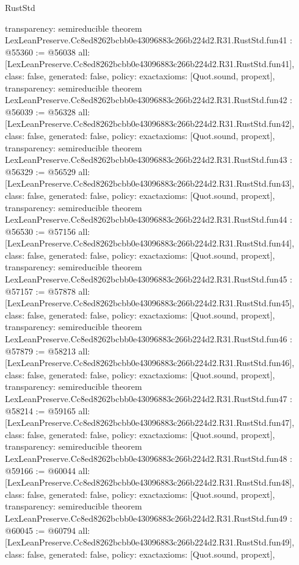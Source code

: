 \begin{lexlean}{RustStd}
\begin{coremodule}
{  transparency: semireducible
}
theorem LexLeanPreserve.Cc8ed8262bcbb0e43096883c266b224d2.R31.RustStd.fun41 : @55360 := @56038 {
  all: [LexLeanPreserve.Cc8ed8262bcbb0e43096883c266b224d2.R31.RustStd.fun41],
  class: false,
  generated: false,
  policy: exact{axioms: [Quot.sound, propext]},
  transparency: semireducible
}
theorem LexLeanPreserve.Cc8ed8262bcbb0e43096883c266b224d2.R31.RustStd.fun42 : @56039 := @56328 {
  all: [LexLeanPreserve.Cc8ed8262bcbb0e43096883c266b224d2.R31.RustStd.fun42],
  class: false,
  generated: false,
  policy: exact{axioms: [Quot.sound, propext]},
  transparency: semireducible
}
theorem LexLeanPreserve.Cc8ed8262bcbb0e43096883c266b224d2.R31.RustStd.fun43 : @56329 := @56529 {
  all: [LexLeanPreserve.Cc8ed8262bcbb0e43096883c266b224d2.R31.RustStd.fun43],
  class: false,
  generated: false,
  policy: exact{axioms: [Quot.sound, propext]},
  transparency: semireducible
}
theorem LexLeanPreserve.Cc8ed8262bcbb0e43096883c266b224d2.R31.RustStd.fun44 : @56530 := @57156 {
  all: [LexLeanPreserve.Cc8ed8262bcbb0e43096883c266b224d2.R31.RustStd.fun44],
  class: false,
  generated: false,
  policy: exact{axioms: [Quot.sound, propext]},
  transparency: semireducible
}
theorem LexLeanPreserve.Cc8ed8262bcbb0e43096883c266b224d2.R31.RustStd.fun45 : @57157 := @57878 {
  all: [LexLeanPreserve.Cc8ed8262bcbb0e43096883c266b224d2.R31.RustStd.fun45],
  class: false,
  generated: false,
  policy: exact{axioms: [Quot.sound, propext]},
  transparency: semireducible
}
theorem LexLeanPreserve.Cc8ed8262bcbb0e43096883c266b224d2.R31.RustStd.fun46 : @57879 := @58213 {
  all: [LexLeanPreserve.Cc8ed8262bcbb0e43096883c266b224d2.R31.RustStd.fun46],
  class: false,
  generated: false,
  policy: exact{axioms: [Quot.sound, propext]},
  transparency: semireducible
}
theorem LexLeanPreserve.Cc8ed8262bcbb0e43096883c266b224d2.R31.RustStd.fun47 : @58214 := @59165 {
  all: [LexLeanPreserve.Cc8ed8262bcbb0e43096883c266b224d2.R31.RustStd.fun47],
  class: false,
  generated: false,
  policy: exact{axioms: [Quot.sound, propext]},
  transparency: semireducible
}
theorem LexLeanPreserve.Cc8ed8262bcbb0e43096883c266b224d2.R31.RustStd.fun48 : @59166 := @60044 {
  all: [LexLeanPreserve.Cc8ed8262bcbb0e43096883c266b224d2.R31.RustStd.fun48],
  class: false,
  generated: false,
  policy: exact{axioms: [Quot.sound, propext]},
  transparency: semireducible
}
theorem LexLeanPreserve.Cc8ed8262bcbb0e43096883c266b224d2.R31.RustStd.fun49 : @60045 := @60794 {
  all: [LexLeanPreserve.Cc8ed8262bcbb0e43096883c266b224d2.R31.RustStd.fun49],
  class: false,
  generated: false,
  policy: exact{axioms: [Quot.sound, propext]},
}
\end{coremodule}
\end{lexlean}
